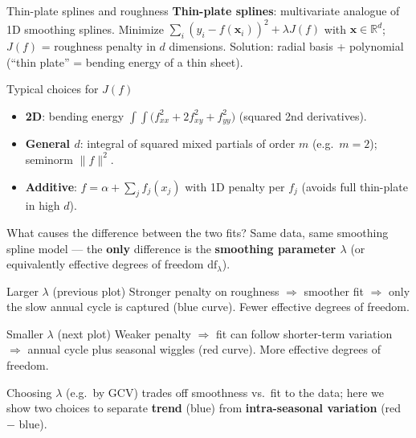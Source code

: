 \documentclass[aspectratio=169]{beamer}
\begin{document}
\begin{frame}{Thin-plate splines and roughness}
\small
\textbf{Thin-plate splines}: multivariate analogue of 1D smoothing splines. Minimize $\sum_i (y_i - f(\mathbf{x}_i))^2 + \lambda J(f)$ with $\mathbf{x} \in \mathbb{R}^d$; $J(f)$ = roughness penalty in $d$ dimensions. Solution: radial basis + polynomial (``thin plate'' = bending energy of a thin sheet).

\begin{block}{Typical choices for $J(f)$}
\begin{itemize}
    \item \textbf{2D}: bending energy $\int\!\!\int \bigl( f_{xx}^2 + 2 f_{xy}^2 + f_{yy}^2 \bigr)$ (squared 2nd derivatives).
    \item \textbf{General $d$}: integral of squared mixed partials of order $m$ (e.g.\ $m{=}2$); seminorm $\|f\|^2$.
    \item \textbf{Additive}: $f = \alpha + \sum_j f_j(x_j)$ with 1D penalty per $f_j$ (avoids full thin-plate in high $d$).
\end{itemize}
\end{block}
\end{frame}

\begin{frame}{What causes the difference between the two fits?}
\small
Same data, same smoothing spline model — the \textbf{only} difference is the \textbf{smoothing parameter $\lambda$} (or equivalently effective degrees of freedom $\text{df}_\lambda$).

\begin{block}{Larger $\lambda$ (previous plot)}
Stronger penalty on roughness $\Rightarrow$ smoother fit $\Rightarrow$ only the slow annual cycle is captured (blue curve). Fewer effective degrees of freedom.
\end{block}

\begin{block}{Smaller $\lambda$ (next plot)}
Weaker penalty $\Rightarrow$ fit can follow shorter-term variation $\Rightarrow$ annual cycle plus seasonal wiggles (red curve). More effective degrees of freedom.
\end{block}

\vspace{0.2cm}
Choosing $\lambda$ (e.g.\ by GCV) trades off smoothness vs.\ fit to the data; here we show two choices to separate \textbf{trend} (blue) from \textbf{intra-seasonal variation} (red $-$ blue).
\end{frame}
\end{document}
